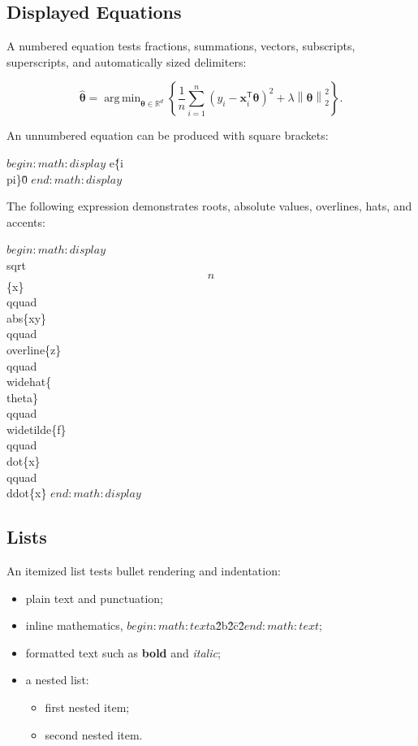\documentclass[10pt,a4paper,twocolumn]{article}
\theoremstyle{definition}
\theoremstyle{remark}
\newcommand{\R}{\mathbb{R}}
\newcommand{\norm}[1]{\left\lVert #1 \right\rVert}
\newcommand{\abs}[1]{\left\lvert #1 \right\rvert}
\newcommand{\vect}[1]{\bm{#1}}
\DeclareMathOperator*{\argmin}{arg\,min}
\begin{document}
\subsection{Displayed Equations}

A numbered equation tests fractions, summations, vectors, subscripts,
superscripts, and automatically sized delimiters:

\begin{equation}
  \widehat{\vect{\theta}}
  =
  \argmin_{\vect{\theta}\in\R^d}
  \left\{
    \frac{1}{n}
    \sum_{i=1}^{n}
    \left(
      y_i-\vect{x}_i^{\mathsf T}\vect{\theta}
    \right)^2
    +
    \lambda\norm{\vect{\theta}}_2^2
  \right\}.
\end{equation}

An unnumbered equation can be produced with square brackets:

$begin:math:display$
  e\^\{i\\pi\}\=0\.
$end:math:display$

The following expression demonstrates roots, absolute values,
overlines, hats, and accents:

$begin:math:display$
  \\sqrt\[n\]\{x\}\,
  \\qquad
  \\abs\{x\-y\}\,
  \\qquad
  \\overline\{z\}\,
  \\qquad
  \\widehat\{\\theta\}\,
  \\qquad
  \\widetilde\{f\}\,
  \\qquad
  \\dot\{x\}\,
  \\qquad
  \\ddot\{x\}\.
$end:math:display$

\subsection{Lists}

An itemized list tests bullet rendering and indentation:

\begin{itemize}
  \item plain text and punctuation;
  \item inline mathematics, $begin:math:text$a\^2\+b\^2\=c\^2$end:math:text$;
  \item formatted text such as \textbf{bold} and \textit{italic};
  \item a nested list:
    \begin{itemize}
      \item first nested item;
      \item second nested item.
    \end{itemize}
\end{itemize}
\end{document}
